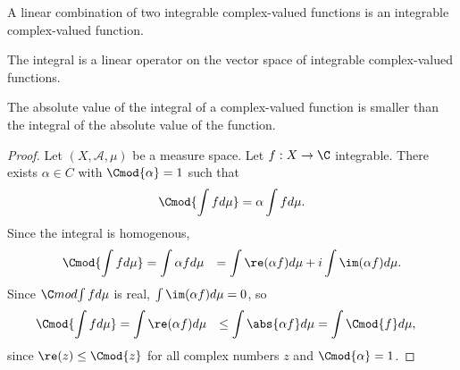 \begin{proposition}
A linear combination
of two integrable complex-valued
functions is an integrable
complex-valued function.\end{proposition}
\begin{proposition}
The integral is a linear
operator on the vector space
of integrable complex-valued
functions.\end{proposition}
\begin{proposition}
The absolute value of the integral of a complex-valued function is smaller than the integral of the absolute value of the function.
\begin{proof}Let $(X, \mathcal{A} , \mu )$ be a measure space.
Let $f: X \to \C $ integrable.
There exists $\alpha  \in C$ with $\Cmod{\alpha } = 1$ such that
  \[
\Cmod{\int f d\mu } = \alpha  \int f d\mu .
  \]
Since the integral is homogenous,
  \[
\begin{aligned}
\Cmod{\int  f d\mu }
&= \int  \alpha  f d\mu
&= \int  \re(\alpha  f) d\mu  + i \int  \im(\alpha  f)d\mu .
\end{aligned}
  \]
Since $\C mod{\int  f d\mu }$ is real, $\int  \im(\alpha  f) d\mu  = 0$, so
    \[
\begin{aligned}
\Cmod{\int f d\mu }
&= \int  \re(\alpha  f) d\mu
&\leq \int  \abs{\alpha  f} d\mu
&= \int  \Cmod{f} d\mu ,
\end{aligned}
    \]
since $\re(z) \leq \Cmod{z}$ for all complex numbers $z$ and $\Cmod{\alpha } = 1$.\end{proof}\end{proposition}